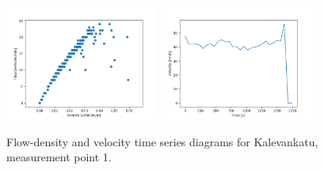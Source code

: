 \documentclass[english, 12pt, a4paper, elec, utf8, pdfa, online]{aaltothesis}
\begin{document}
\begin{figure}[ht!]
    \centering
    \includegraphics[width=0.45\textwidth]{graphs/Kalevankatu_1_flw_dns.png}
    \includegraphics[width=0.45\textwidth]{graphs/Kalevankatu_1_spd_time_6.png}
    \caption{Flow-density and velocity time series diagrams for Kalevankatu, measurement point 1.}
\end{figure}
\end{document}
